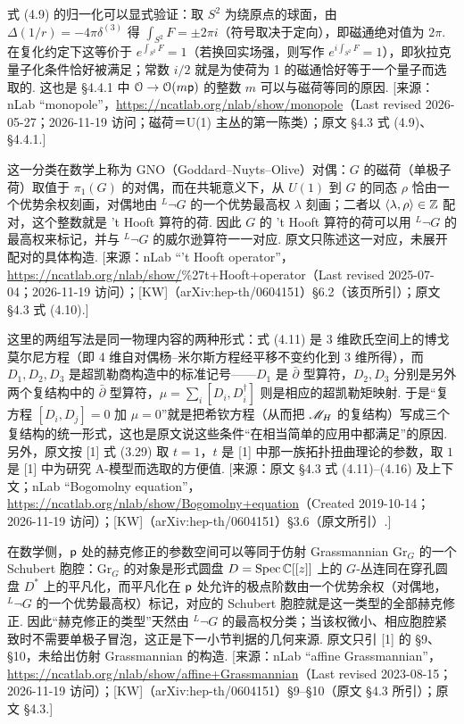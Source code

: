 \begin{description}[leftmargin=5.8em,labelwidth=5em,labelsep=0.6em,itemsep=0.15ex,topsep=0.2ex]
\item[4.3-1] 式 (4.9) 的归一化可以显式验证：取 $S^2$ 为绕原点的球面，由 $\Delta(1/r)=-4\pi\delta^{(3)}$ 得 $\int_{S^2}F=\pm 2\pi i$（符号取决于定向），即磁通绝对值为 $2\pi$. 在复化约定下这等价于 $e^{\int_{S^2}F}=1$（若换回实场强，则写作 $e^{i\int_{S^2}F}=1$），即狄拉克量子化条件恰好被满足；常数 $i/2$ 就是为使荷为 1 的磁通恰好等于一个量子而选取的. 这也是 §4.4.1 中 ${\mathcal O}\to{\mathcal O}(m{\sf p})$ 的整数 $m$ 可以与磁荷等同的原因. [来源：nLab “monopole”，\url{https://ncatlab.org/nlab/show/monopole}（Last revised 2026-05-27；2026-11-19 访问；磁荷＝U(1) 主丛的第一陈类）；原文 §4.3 式 (4.9)、§4.4.1.]
\item[4.3-2] 这一分类在数学上称为 GNO（Goddard–Nuyts–Olive）对偶：$G$ 的磁荷（单极子荷）取值于 $\pi_1(G)$ 的对偶，而在共轭意义下，从 $U(1)$ 到 $G$ 的同态 $\rho$ 恰由一个优势余权刻画，对偶地由 $^L\neg G$ 的一个优势最高权 $\lambda$ 刻画；二者以 $\langle\lambda,\rho\rangle\in{\mathbb Z}$ 配对，这个整数就是 't Hooft 算符的荷. 因此 $G$ 的 't Hooft 算符的荷可以用 $^L\neg G$ 的最高权来标记，并与 $^L\neg G$ 的威尔逊算符一一对应. 原文只陈述这一对应，未展开配对的具体构造. [来源：nLab “’t Hooft operator”，\url{https://ncatlab.org/nlab/show/}\%27t+Hooft+operator（Last revised 2025-07-04；2026-11-19 访问）；[KW]（arXiv:hep-th/0604151）§6.2（该页所引）；原文 §4.3 式 (4.10).]
\item[4.3-3] 这里的两组写法是同一物理内容的两种形式：式 (4.11) 是 3 维欧氏空间上的博戈莫尔尼方程（即 4 维自对偶杨--米尔斯方程经平移不变约化到 3 维所得），而 $D_1,D_2,D_3$ 是超凯勒商构造中的标准记号——$D_1$ 是 $\bar\partial$ 型算符，$D_2,D_3$ 分别是另外两个复结构中的 $\bar\partial$ 型算符，$\mu=\sum_i[D_i,D_i^\dagger]$ 则是相应的超凯勒矩映射. 于是“复方程 $[D_i,D_j]=0$ 加 $\mu=0$”就是把希钦方程（从而把 ${{\mathscr{M}}_H}$ 的复结构）写成三个复结构的统一形式，这也是原文说这些条件“在相当简单的应用中都满足”的原因. 另外，原文按 [1] 式 (3.29) 取 $t=1$，$t$ 是 [1] 中那一族拓扑扭曲理论的参数，取 $1$ 是 [1] 中为研究 A-模型而选取的方便值. [来源：原文 §4.3 式 (4.11)–(4.16) 及上下文；nLab “Bogomolny equation”，\url{https://ncatlab.org/nlab/show/Bogomolny+equation}（Created 2019-10-14；2026-11-19 访问）；[KW]（arXiv:hep-th/0604151）§3.6（原文所引）.]
\item[4.3-4] 在数学侧，${\sf p}$ 处的赫克修正的参数空间可以等同于仿射 Grassmannian $\mathrm{Gr}_G$ 的一个 Schubert 胞腔：$\mathrm{Gr}_G$ 的对象是形式圆盘 $D=\mathrm{Spec}\,{\mathbb C}[[z]]$ 上的 $G$-丛连同在穿孔圆盘 $D^*$ 上的平凡化，而平凡化在 ${\sf p}$ 处允许的极点阶数由一个优势余权（对偶地，$^L\neg G$ 的一个优势最高权）标记，对应的 Schubert 胞腔就是这一类型的全部赫克修正. 因此“赫克修正的类型”天然由 $^L\neg G$ 的最高权分类；当该权微小、相应胞腔紧致时不需要单极子冒泡，这正是下一小节判据的几何来源. 原文只引 [1] 的 §9、§10，未给出仿射 Grassmannian 的构造. [来源：nLab “affine Grassmannian”，\url{https://ncatlab.org/nlab/show/affine+Grassmannian}（Last revised 2023-08-15；2026-11-19 访问）；[KW]（arXiv:hep-th/0604151）§9–§10（原文 §4.3 所引）；原文 §4.3.]
\end{description}

